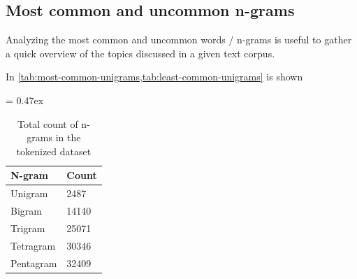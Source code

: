 \subsection{Most common and uncommon n-grams}

Analyzing the most common and uncommon words / n-grams is useful to gather a quick overview of the topics discussed in a given text corpus.

In \cref{tab:most-common-unigrams,tab:least-common-unigrams} is shown


\begin{table}[t]
	\caption{Total count of n-grams in the tokenized dataset}
	\extrarowsep = 0.47ex
	\centering
	\begin{tabu} to 0.18\textwidth { X[m,l] X[m,r] }
		\rowfont{\bfseries\itshape} N-gram & Count \\
		\hline
		Unigram		&	 2487	\\
		Bigram		&	14140	\\
		Trigram		&	25071	\\
		Tetragram	&	30346	\\
		Pentagram	& 	32409	\\
	\end{tabu}
	\label{tab:n-grams-counts}
\end{table}



